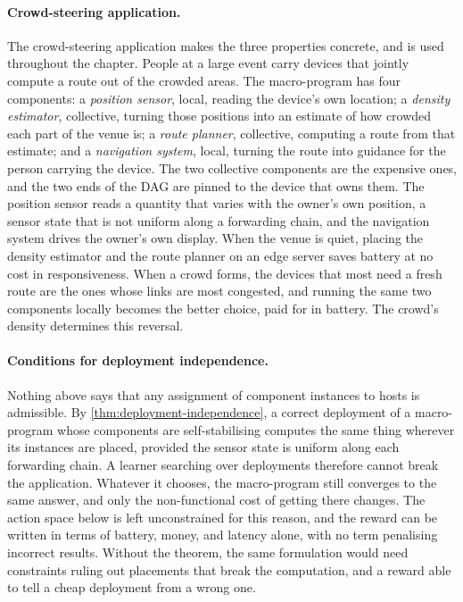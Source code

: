 \paragraph{Crowd-steering application.}
The crowd-steering application makes the three properties concrete,
and is used throughout the chapter.
%
People at a large event carry devices that jointly compute a route out of the crowded areas.
%
The macro-program has four components:
a \emph{position sensor}, local, reading the device's own location;
a \emph{density estimator}, collective, turning those positions into an estimate of how crowded each part of the venue is;
a \emph{route planner}, collective, computing a route from that estimate;
and a \emph{navigation system}, local, turning the route into guidance for the person carrying the device.
%
The two collective components are the expensive ones,
and the two ends of the \ac{DAG} are pinned to the device that owns them.
%
The position sensor reads a quantity that varies with the owner's own position,
a sensor state that is not uniform along a forwarding chain,
and the navigation system drives the owner's own display.
%
When the venue is quiet,
placing the density estimator and the route planner on an edge server saves battery at no cost in responsiveness.
%
When a crowd forms,
the devices that most need a fresh route are the ones whose links are most congested,
and running the same two components locally becomes the better choice, paid for in battery.
%
The crowd's density determines this reversal.

\paragraph{Conditions for deployment independence.}
Nothing above says that any assignment of component instances to hosts is admissible.
%
By \cref{thm:deployment-independence},
a correct deployment of a macro-program whose components are self-stabilising computes the same thing wherever its instances are placed,
provided the sensor state is uniform along each forwarding chain.
%
A learner searching over deployments therefore cannot break the application.
Whatever it chooses, the macro-program still converges to the same answer, and only the non-functional cost of getting there changes.
%
The action space below is left unconstrained for this reason,
and the reward can be written in terms of battery, money, and latency alone, with no term penalising incorrect results.
%
Without the theorem, the same formulation would need constraints ruling out placements that break the computation,
and a reward able to tell a cheap deployment from a wrong one.

